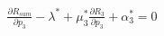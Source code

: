 \documentclass[preview]{standalone}
\begin{document}
\begin{align*}
\frac{\partial {R_{sum}}}{\partial {p_3}} - \lambda^\ast + \mu_3^\ast \frac{\partial {R_3}}{\partial {p_3}} + \alpha_3^\ast = 0
\end{align*}
\end{document}
